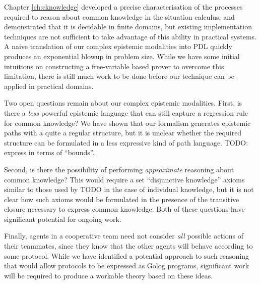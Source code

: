 Chapter \ref{ch:cknowledge} developed a precise characterisation
of the processes required to reason about common knowledge in the
situation calculus, and demonstrated that it is decidable in finite
domains, but existing implementation techniques are not sufficient
to take advantage of this ability in practical systems. A naive translation
of our complex epistemic modalities into PDL quickly produces an exponential
blowup in problem size. While we have some initial intuitions on constructing
a free-variable based prover to overcome this limitation, there is
still much work to be done before our technique can be applied in
practical domains.

Two open questions remain about our complex epistemic modalities.
First, is there a \emph{less} powerful epistemic language that can
still capture a regression rule for common knowledge? We have shown
that our formalism generates epistemic paths with a quite a regular
structure, but it is unclear whether the required structure can be
formulated in a less expressive kind of path language. TODO: express
in terms of {}``bounds''.

Second, is there the possibility of performing \emph{approximate}
reasoning about common knowledge? This would require a set {}``disjunctive
knowledge'' axioms similar to those used by TODO in the case of individual
knowledge, but it is not clear how such axioms would be formulated
in the presence of the transitive closure necessary to express common
knowledge. Both of these questions have significant potential for
ongoing work.

Finally, agents in a cooperative team need not consider \emph{all}
possible actions of their teammates, since they know that the other
agents will behave according to some protocol. While we have identified
a potential approach to such reasoning that would allow protocols
to be expressed as Golog programs, significant work will be required
to produce a workable theory based on these ideas.

